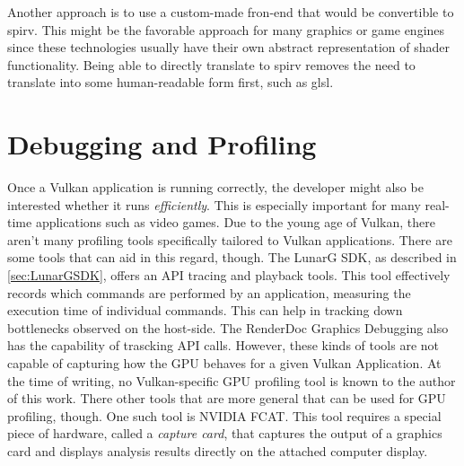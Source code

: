     Another approach is to use a custom-made fron-end that would be convertible to \gls{spirv}. This might be the favorable approach for many graphics or game engines since these technologies usually have their own abstract representation of shader functionality. Being able to directly translate to \gls{spirv} removes the need to translate into some human-readable form first, such as \gls{glsl}.


  \section{Debugging and Profiling}
  \label{sec:DebuggingAndProfiling}

    Once a Vulkan application is running correctly, the developer might also be interested whether it runs \textit{efficiently}. This is especially important for many real-time applications such as video games. Due to the young age of Vulkan, there aren't many profiling tools specifically tailored to Vulkan applications. There are some tools that can aid in this regard, though. The LunarG SDK, as described in \ref{sec:LunarGSDK}, offers an API tracing and playback tools. This tool effectively records which commands are performed by an application, measuring the execution time of individual commands. This can help in tracking down bottlenecks observed on the host-side. The RenderDoc Graphics Debugging\cite{renderdoc} also has the capability of trascking API calls. However, these kinds of tools are not capable of capturing how the GPU behaves for a given Vulkan Application. At the time of writing, no Vulkan-specific GPU profiling tool is known to the author of this work. There other tools that are more general that can be used for GPU profiling, though. One such tool is NVIDIA FCAT\cite{nvidiafcat}. This tool requires a special piece of hardware, called a \textit{capture card}, that captures the output of a graphics card and displays analysis results directly on the attached computer display.

